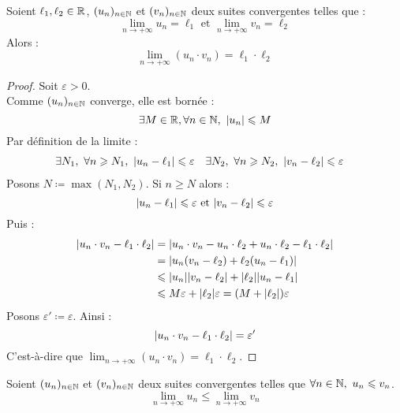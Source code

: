 \begin{theorem}
    Soient $\ell_1, \ell_2 \in \mathbb{R}$, $(u_n)_{n \in \mathbb{N}}$ et $(v_n)_{n \in \mathbb{N}}$ deux suites convergentes telles que :
    \[ \lim_{n \to + \infty} u_n = \ell_1 \text{ et } \lim_{n \to +\infty} v_n = \ell_2 \]
    Alors :
    \[ \lim_{n \to +\infty} (u_n \cdot v_n) = \ell_1 \cdot \ell_2 \]
\end{theorem}

\begin{proof}
    Soit $\varepsilon > 0$.
    \\
    Comme $(u_n)_{n \in \mathbb{N}}$ converge, elle est bornée :
    \[ \exists M \in \mathbb{R}, \forall n \in \mathbb{N},\ \abs{u_n} \leqslant M \]
    Par définition de la limite :
    \begin{align*}
        &\exists N_1,\ \forall n \geqslant N_1,\ \abs{u_n - \ell_1} \leqslant \varepsilon &
        &\exists N_2,\ \forall n \geqslant N_2,\ \abs{v_n - \ell_2} \leqslant \varepsilon
    \end{align*}
    Posons $N \coloneqq \max(N_1, N_2)$. Si $n \geq N$ alors :
    \[ \abs{u_n - \ell_1} \leqslant \varepsilon \text{ et } \abs{v_n - \ell_2} \leqslant \varepsilon \]
    Puis : 
    \begin{align*}
        \abs{u_n \cdot v_n - \ell_1 \cdot \ell_2} &= \abs{u_n \cdot v_n - u_n \cdot \ell_2 + u_n \cdot \ell_2 - \ell_1 \cdot \ell_2} \\
        &= \abs{u_n(v_n - \ell_2) + \ell_2 (u_n - \ell_1)} \\ 
        &\leqslant \abs{u_n} \abs{v_n - \ell_2} + \abs{\ell_2} \abs{u_n - \ell_1} \\ 
        &\leqslant M \varepsilon + \abs{\ell_2} \varepsilon = (M + \abs{\ell_2}) \varepsilon
    \end{align*}
    Posons $\varepsilon' \coloneqq \varepsilon$. Ainsi :
    \[ \abs{u_n \cdot v_n - \ell_1 \cdot \ell_2} = \varepsilon' \]
    C'est-à-dire que $\lim_{n \to +\infty} (u_n \cdot v_n) = \ell_1 \cdot \ell_2$.
\end{proof}

\begin{theorem}
    Soient $(u_n)_{n \in \mathbb{N}}$ et $(v_n)_{n \in \mathbb{N}}$ deux suites convergentes telles que $\forall n \in \mathbb{N},\ u_n \leqslant v_n$. 
    \[ \lim_{n \to +\infty} u_n \leq \lim_{n \to +\infty} v_n \]
\end{theorem}

